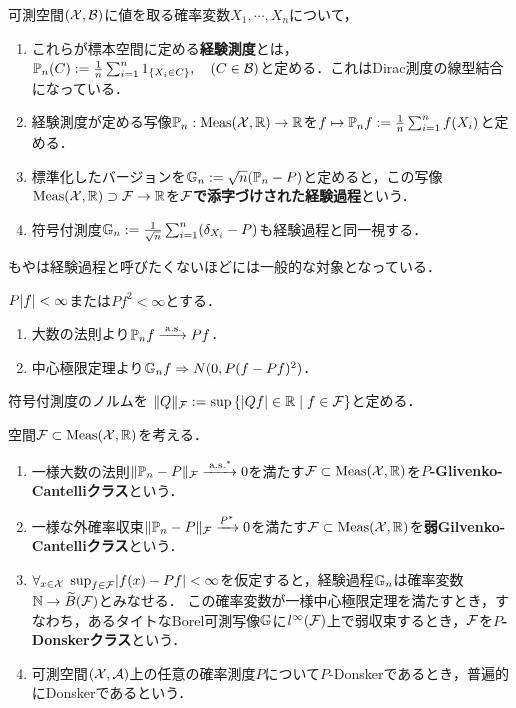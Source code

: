 \documentclass[uplatex,dvipdfmx]{jsreport}
\begin{document}
\begin{definition}
    可測空間$(\mathcal{X},\mathcal{B})$に値を取る確率変数$X_1,\cdots,X_n$について，
    \begin{enumerate}
        \item これらが標本空間に定める\textbf{経験測度}とは，$\mathbb{P}_n(C):=\frac{1}{n}\sum^n_{i=1}1_{\left\{X_i\in C\right\}},\quad(C\in\mathcal{B})$と定める．これはDirac測度の線型結合になっている．
        \item 経験測度が定める写像$\mathbb{P}_n:\mathrm{Meas}(\mathcal{X},\mathbb{R})\to\mathbb{R}$を$f\mapsto\mathbb{P}_nf:=\frac{1}{n}\sum^n_{i=1}f(X_i)$と定める．
        \item 標準化したバージョンを$\mathbb{G}_n:=\sqrt{n}(\mathbb{P}_n-P)$と定めると，この写像$\mathrm{Meas}(\mathcal{X},\mathbb{R})\supset\mathcal{F}\to\mathbb{R}$を\textbf{$\mathcal{F}$で添字づけされた経験過程}という．
        \item 符号付測度$\mathbb{G}_n:=\frac{1}{\sqrt{n}}\sum_{i=1}^n(\delta_{X_i}-P)$も経験過程と同一視する．
    \end{enumerate}
\end{definition}
\begin{remarks}
    もやは経験過程と呼びたくないほどには一般的な対象となっている．
\end{remarks}

\begin{proposition}[各点収束の結果は古典的]\label{prop-large-number-theorem-to-empirical-process}
    $P\lvert f\rvert<\infty$または$Pf^2<\infty$とする．
    \begin{enumerate}
        \item 大数の法則より$\mathbb{P}_nf\xrightarrow{\;\mathrm{a.s.}} Pf$．
        \item 中心極限定理より$\mathbb{G}_nf\Rightarrow N(0,P(f-Pf)^2)$．
    \end{enumerate}
\end{proposition}

\begin{notation}[符号付き測度の一様ノルム]
    符号付測度のノルムを
    $\|Q\|_{\mathcal{F}}:=\sup\left\{\lvert Qf\rvert\in\mathbb{R}\mid f\in\mathcal{F}\right\}$と定める．
\end{notation}

\begin{definition}
    空間$\mathcal{F}\subset\mathrm{Meas}(\mathcal{X},\mathbb{R})$を考える．
    \begin{enumerate}
        \item 一様大数の法則$\|\mathbb{P}_n-P\|_{\mathcal{F}}\xrightarrow{\;\mathrm{a.s.}^*}0$を満たす$\mathcal{F}\subset\mathrm{Meas}(\mathcal{X},\mathbb{R})$を\textbf{$P$-Glivenko-Cantelliクラス}という．
        \item 一様な外確率収束$\|\mathbb{P}_n-P\|_{\mathcal{F}}\xrightarrow{P^*}0$を満たす$\mathcal{F}\subset\mathrm{Meas}(\mathcal{X},\mathbb{R})$を\textbf{弱Gilvenko-Cantelliクラス}という．
        \item $\forall_{x\in\mathcal{X}}\;\sup_{f\in\mathcal{F}}\lvert f(x)-Pf\rvert<\infty$を仮定すると，経験過程$\mathbb{G}_n$は確率変数$\mathbb{N}\to\widetilde{B}(\mathcal{F})$とみなせる．
        この確率変数が一様中心極限定理を満たすとき，すなわち，あるタイトなBorel可測写像$\mathbb{G}$に$l^\infty(\mathcal{F})$上で弱収束するとき，$\mathcal{F}$を\textbf{$P$-Donskerクラス}という．
        \item 可測空間$(\mathcal{X},\mathcal{A})$上の任意の確率測度$P$について$P$-Donskerであるとき，普遍的にDonskerであるという．
    \end{enumerate}
\end{definition}
\end{document}
